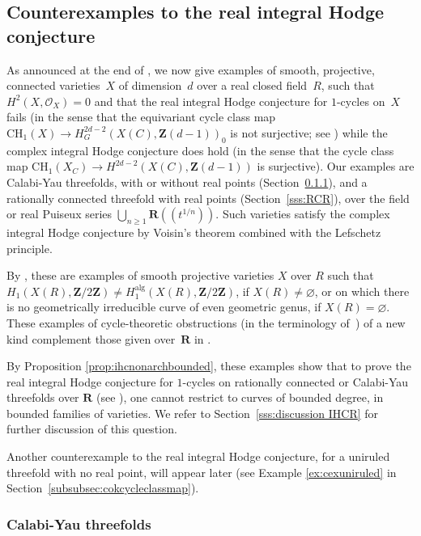 \documentclass[JEP,XML,SOM,Unicode]{cedram}
\newcommand{\lpr}{(\!(}
\newcommand{\rpr}{)\!)}
\theoremstyle{plain}
\theoremstyle{definition}
\numberwithin{equation}{section}
\newcommand{\alg}{{\mathrm{alg}}}
\newcommand{\sO}{{\mathscr O}}
\newcommand{\R}{{\mathbf R}}
\newcommand{\Z}{{\mathbf Z}}
\newcommand{\CH}{\mathrm{CH}}
\begin{document}
\subsection{Counterexamples to the real integral Hodge conjecture}
\label{par:cexnonarch}
As announced at the end of \cite[\textsection\ref*{BW1-section:examples}]{BW1},
we now give examples of smooth, projective, connected varieties~$X$ of dimension~$d$ over a real closed field~$R$,
such that $H^2(X,\sO_X)=0$ and that the real integral Hodge conjecture for $1$\nobreakdash-cycles on~$X$ fails
(in the sense that the equivariant cycle class map $\CH_1(X)\to H^{2d-2}_G(X(C),\Z(d-1))_0$ is not surjective;
see \cite[Def.\,\ref*{BW1-def:ihc real closed field}]{BW1})
while the complex integral Hodge conjecture does hold (in the sense that
the cycle class map $\CH_1(X_C)\to H^{2d-2}(X(C),\Z(d-1))$ is surjective).
Our examples are Calabi-Yau threefolds, with or without real points (Section~\ref{sss:CYR}), and a rationally connected threefold with real points (Section~\ref{sss:RCR}),
over the field or real Puiseux series $\bigcup_{n\geq 1}\R\lpr t^{1/n}\rpr$.
Such varieties satisfy the complex integral Hodge conjecture
by Voisin's theorem \cite[Th.\,2]{voisinthreefolds} combined with
the Lefschetz principle.

By \cite[Cor.\,\ref*{BW1-cor:IHC pour solides RC ou CY}]{BW1}, these are examples of smooth projective varieties $X$ over $R$ such that $H_1(X(R),\Z/2\Z)\neq H_1^\alg(X(R),\Z/2\Z)$, if $X(R)\neq\varnothing$, or on which there is no geometrically irreducible curve of even geometric
genus, if $X(R)=\varnothing$.
These examples of cycle-theoretic obstructions
(in the terminology of~\cite[\textsection\ref*{BW1-nomenclature}]{BW1})
of a new kind
complement those given over~$\R$ in \cite[\S\ref*{BW1-subsec:cycle theoretic obs}]{BW1}.

By Proposition \ref{prop:ihcnonarchbounded}, these examples show that to prove the real integral Hodge conjecture for $1$-cycles on rationally connected or Calabi-Yau threefolds over $\R$ (see \cite [Quest.\,\ref*{BW1-mainquestion}]{BW1}), one cannot restrict to curves of bounded degree, in bounded families of varieties. We refer to Section~\ref{sss:discussion IHCR} for further discussion of this question.

Another counterexample to the real integral Hodge conjecture, for a uniruled threefold with no real point, will appear later (see Example \ref{ex:cexuniruled} in Section~\ref{subsubsec:cokcycleclassmap}).

\subsubsection{Calabi-Yau threefolds}
\label{sss:CYR}
\end{document}
